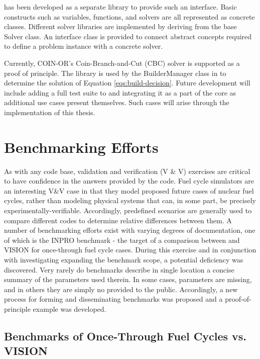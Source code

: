 \Cyclopts has been developed as a separate library to provide such an
interface. Basic constructs such as variables, functions, and solvers are all
represented as concrete classes. Different solver libraries are implemented by
deriving from the base Solver class. An interface class is provided to connect
abstract concepts required to define a problem instance with a concrete solver.

Currently, COIN-OR's Coin-Branch-and-Cut (CBC) \cite{lougee_common_2003} solver
is supported as a proof of principle. The \Cyclopts library is used by the
BuilderManager class in \Cyclus to determine the solution of Equation
\ref{eqs:build-decision}. Future development will include adding a full test
suite to \Cyclopts and integrating it as a part of the \Cyclus core as
additional use cases present themselves. Such cases will arise through the
implementation of this thesis.

\section{Benchmarking Efforts}\label{sec:prev-benchmark}

As with any code base, validation and verification (V \& V) exercises are
critical to have confidence in the answers provided by the code. Fuel cycle
simulators are an interesting V\&V case in that they model proposed future cases
of nuclear fuel cycles, rather than modeling physical systems that can, in some
part, be precisely experimentally-verifiable. Accordingly, predefined scenarios
are generally used to compare different codes to determine relative differences
between them. A number of benchmarking efforts exist with varying degrees of
documentation, one of which is the INPRO benchmark - the target of a comparison
between \Cyclus and VISION for once-through fuel cycle cases. During this
exercise and in conjunction with investigating expanding the benchmark scope, a
potential deficiency was discovered. Very rarely do benchmarks describe in
single location a concise summary of the parameters used therein. In some cases,
parameters are missing, and in others they are simply no provided to the
public. Accordingly, a new process for forming and disseminating benchmarks was
proposed and a proof-of-principle example was developed.

\subsection{Benchmarks of Once-Through Fuel Cycles vs. VISION}

